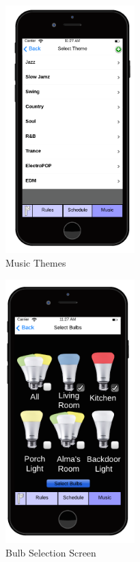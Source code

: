 \documentclass[12pt]{article}
\begin{document}
  \begin{figure}[ht!]
    \centering
    \includegraphics[width=50mm]{iPhone_music_theme.png}
    \caption{Music Themes}
    \label{fig:musicThemes}
  \end{figure}
  
  \begin{figure}[ht!]
    \centering
    \includegraphics[width=50mm]{iPhone_music_select_bulb.png}
    \caption{Bulb Selection Screen}
    \label{fig:bulbSelectionScreen}
  \end{figure}
  
\end{document}
